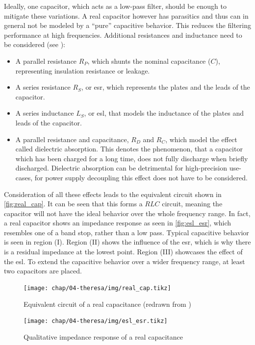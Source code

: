 Ideally, one capacitor, which acts as a low-pass filter, should be enough to mitigate these variations.
A real capacitor however has parasitics and thus can in general not be modeled by a ``pure'' capacitive behavior. This reduces the filtering performance at high frequencies. 
Additional resistances and inductance need to be considered (see \cite{decouple}):
\begin{itemize}
	\item A parallel resistance $R_P$, which shunts the nominal capacitance ($C$), representing insulation resistance or leakage.
	\item A series resistance $R_S$, or \gls{esr}, which represents the plates and the leads of the capacitor.
	\item A series inductance $L_S$, or \gls{esl}, that models the inductance of the plates and leads of the capacitor.
	\item A parallel resistance and capacitance, $R_D$ and $R_C$, which model the effect called dielectric absorption. This denotes the phenomenon, that a capacitor which has been charged for a long time, does not fully discharge when briefly discharged. Dielectric absorption can be detrimental for high-precision use-cases, for power supply decoupling this effect does not have to be considered.
\end{itemize}

Consideration of all these effects leads to the equivalent circuit shown in \autoref{fig:real_cap}.
It can be seen that this forms a $RLC$ circuit, meaning the capacitor will not have the ideal behavior over the whole frequency range. 
In fact, a real capacitor shows an impedance response as seen in \autoref{fig:esl_esr}, which resembles one of a band stop, rather than a low pass.
Typical capacitive behavior is seen in region (I).
Region (II) shows the influence of the \gls{esr}, which is why there is a residual impedance at the lowest point.
Region (III) showcases the effect of the \gls{esl}. 
To extend the capacitive behavior over a wider frequency range, at least two capacitors are placed.

\tikzexternaldisable
\begin{figure}[tb]
	\centering
	\texttt{[image: chap/04-theresa/img/real\_cap.tikz]}
	\caption[Capacitor equivalent circuit]{Equivalent circuit of a real capacitance (redrawn from \cite{decouple})}
	\label{fig:real_cap}
\end{figure}
\tikzexternalenable

\begin{figure}[tb]
	\centering
	\texttt{[image: chap/04-theresa/img/esl\_esr.tikz]}
	\caption[Impedance response of a real capacitor]{Qualitative impedance response of a real capacitance \cite{Dang2020}}
	\label{fig:esl_esr}
\end{figure}



